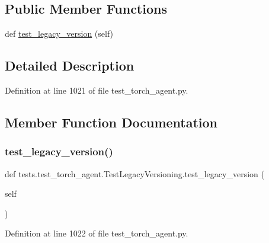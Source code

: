 \subsection*{Public Member Functions}
\begin{DoxyCompactItemize}
\item 
def \hyperlink{classtests_1_1test__torch__agent_1_1TestLegacyVersioning_ab1faa8a34d7089006cfa5746b0ada62f}{test\+\_\+legacy\+\_\+version} (self)
\end{DoxyCompactItemize}


\subsection{Detailed Description}


Definition at line 1021 of file test\+\_\+torch\+\_\+agent.\+py.



\subsection{Member Function Documentation}
\mbox{\label{classtests_1_1test__torch__agent_1_1TestLegacyVersioning_ab1faa8a34d7089006cfa5746b0ada62f}} 
\subsubsection{\texorpdfstring{test\+\_\+legacy\+\_\+version()}{test\_legacy\_version()}}
{\footnotesize\ttfamily def tests.\+test\+\_\+torch\+\_\+agent.\+Test\+Legacy\+Versioning.\+test\+\_\+legacy\+\_\+version (\begin{DoxyParamCaption}\item[{}]{self }\end{DoxyParamCaption})}



Definition at line 1022 of file test\+\_\+torch\+\_\+agent.\+py.


